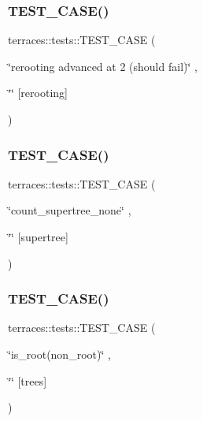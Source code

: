 \subsubsection{\texorpdfstring{T\+E\+S\+T\+\_\+\+C\+A\+S\+E()}{TEST\_CASE()}\hspace{0.1cm}{\footnotesize\ttfamily [44/78]}}
{\footnotesize\ttfamily terraces\+::tests\+::\+T\+E\+S\+T\+\_\+\+C\+A\+SE (\begin{DoxyParamCaption}\item[{\char`\"{}rerooting advanced at 2 (should fail)\char`\"{}}]{,  }\item[{\char`\"{}\char`\"{}}]{\mbox{[}rerooting\mbox{]} }\end{DoxyParamCaption})}

\mbox{\label{namespaceterraces_1_1tests_ada2e4bbb10e908a4ed9ce7c34a54a962}} 
\subsubsection{\texorpdfstring{T\+E\+S\+T\+\_\+\+C\+A\+S\+E()}{TEST\_CASE()}\hspace{0.1cm}{\footnotesize\ttfamily [45/78]}}
{\footnotesize\ttfamily terraces\+::tests\+::\+T\+E\+S\+T\+\_\+\+C\+A\+SE (\begin{DoxyParamCaption}\item[{\char`\"{}count\+\_\+supertree\+\_\+none\char`\"{}}]{,  }\item[{\char`\"{}\char`\"{}}]{\mbox{[}supertree\mbox{]} }\end{DoxyParamCaption})}

\mbox{\label{namespaceterraces_1_1tests_a671769bc09367ff84b390217d22d13f1}} 
\subsubsection{\texorpdfstring{T\+E\+S\+T\+\_\+\+C\+A\+S\+E()}{TEST\_CASE()}\hspace{0.1cm}{\footnotesize\ttfamily [46/78]}}
{\footnotesize\ttfamily terraces\+::tests\+::\+T\+E\+S\+T\+\_\+\+C\+A\+SE (\begin{DoxyParamCaption}\item[{\char`\"{}is\+\_\+root(non\+\_\+root)\char`\"{}}]{,  }\item[{\char`\"{}\char`\"{}}]{\mbox{[}trees\mbox{]} }\end{DoxyParamCaption})}

